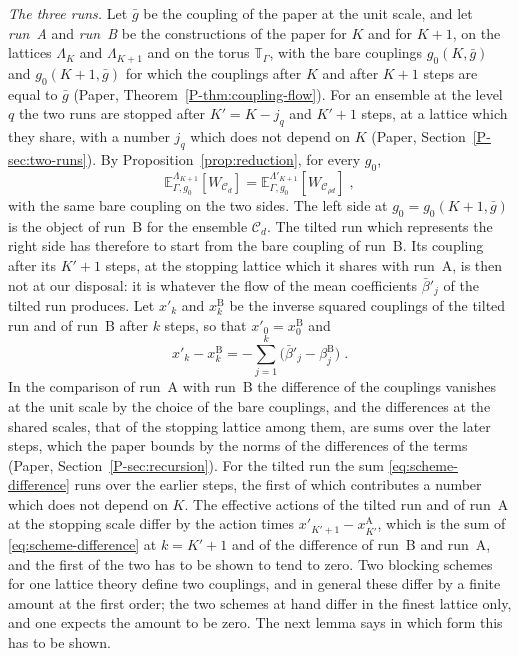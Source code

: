 \documentclass[11pt]{preprint}
\numberwithin{equation}{section}
\theoremstyle{definition}
\theoremstyle{remark}
\theoremstyle{plain}
\begin{document}
\emph{The three runs.} Let $\bar g$ be the coupling of the paper at the unit scale, and let \emph{run~A} and \emph{run~B} be the constructions of the paper for $K$ and for $K + 1$, on the lattices $\Lambda_K$ and $\Lambda_{K+1}$ and on the torus $\mathbb T_\Gamma$, with the bare couplings $g_0(K, \bar g)$ and $g_0(K + 1, \bar g)$ for which the couplings after $K$ and after $K + 1$ steps are equal to $\bar g$ (Paper, Theorem~\ref{P-thm:coupling-flow}). For an ensemble at the level $q$ the two runs are stopped after $K' = K - j_q$ and $K' + 1$ steps, at a lattice which they share, with a number $j_q$ which does not depend on $K$ (Paper, Section~\ref{P-sec:two-runs}). By Proposition~\ref{prop:reduction}, for every $g_0$,
\begin{equation}\label{eq:equality-bridge}
    \mathbb E^{\Lambda_{K+1}}_{\Gamma,g_0}[W_{\mathcal C_d}] = \mathbb E^{\Lambda'_{K+1}}_{\Gamma,g_0}[W_{\mathcal C_{\rho d}}]\;,
\end{equation}
with the same bare coupling on the two sides. The left side at $g_0 = g_0(K + 1, \bar g)$ is the object of run~B for the ensemble $\mathcal C_d$. The tilted run which represents the right side has therefore to start from the bare coupling of run~B. Its coupling after its $K' + 1$ steps, at the stopping lattice which it shares with run~A, is then not at our disposal: it is whatever the flow of the mean coefficients $\bar\beta'_j$ of the tilted run produces. Let $x'_k$ and $x^{\mathrm B}_k$ be the inverse squared couplings of the tilted run and of run~B after $k$ steps, so that $x'_0 = x^{\mathrm B}_0$ and
\begin{equation}\label{eq:scheme-difference}
    x'_k - x^{\mathrm B}_k = -\sum_{j=1}^{k}\bigl(\bar\beta'_j - \beta^{\mathrm B}_j\bigr)\;.
\end{equation}
In the comparison of run~A with run~B the difference of the couplings vanishes at the unit scale by the choice of the bare couplings, and the differences at the shared scales, that of the stopping lattice among them, are sums over the later steps, which the paper bounds by the norms of the differences of the terms (Paper, Section~\ref{P-sec:recursion}). For the tilted run the sum \eqref{eq:scheme-difference} runs over the earlier steps, the first of which contributes a number which does not depend on $K$. The effective actions of the tilted run and of run~A at the stopping scale differ by the action times $x'_{K'+1} - x^{\mathrm A}_{K'}$, which is the sum of \eqref{eq:scheme-difference} at $k = K' + 1$ and of the difference of run~B and run~A, and the first of the two has to be shown to tend to zero. Two blocking schemes for one lattice theory define two couplings, and in general these differ by a finite amount at the first order; the two schemes at hand differ in the finest lattice only, and one expects the amount to be zero. The next lemma says in which form this has to be shown.
\end{document}
